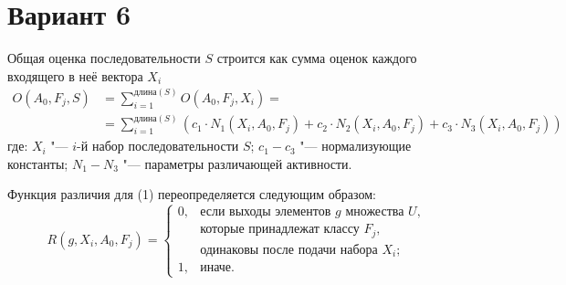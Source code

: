 \documentclass{article}
\begin{document}
\section*{Вариант 6}

Общая оценка последовательности $S$ строится как сумма оценок каждого входящего в неё вектора $X_{i}$
\begin{equation}
\begin{split}
O(A_{0},F_{j},S) &= \sum\limits_{i=1}^{\text{длина}(S)}O(A_{0},F_{j},X_{i}) = \\
&= \sum\limits_{i=1}^{\text{длина}(S)}(c_{1}\cdot N_{1}(X_{i},A_{0},F_{j})+c_{2}\cdot N_{2}(X_{i},A_{0},F_{j})+c_{3}\cdot N_{3}(X_{i},A_{0},F_{j}))
\end{split}
\end{equation}
где: $X_{i}$ "--- $i$-й набор последовательности $S$; $c_{1}-c_{3}$ "--- нормализующие константы; $N_{1}-N_{3}$ "--- параметры различающей активности.

Функция различия для (1) переопределяется следующим образом:
\begin{equation}
R(g, X_{i}, A_{0}, F_{j}) =
\begin{cases}
0, & \text{если выходы элементов } g \text{ множества } U, \\
   & \text{которые принадлежат классу } F_{j}, \\
   & \text{одинаковы после подачи набора } X_{i}; \\
1, & \text{иначе.}
\end{cases}
\end{equation}
\end{document}
